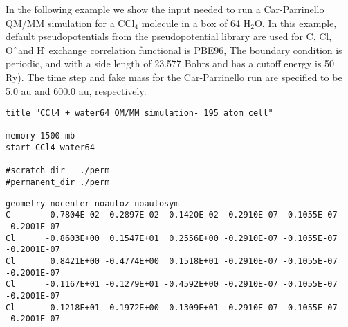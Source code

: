 In the following example we show the input needed to run a Car-Parrinello 
QM/MM simulation for a CCl$_4$ molecule in a box of 64 H$_2$O. 
In this example, default pseudopotentials from the pseudopotential library are used 
for C, Cl, O\^\ and H\^\, exchange correlation functional is PBE96, The boundary condition is periodic, and
with a side length of 23.577 Bohrs and has a cutoff energy is 50 Ry).  The time step and fake mass
for the Car-Parrinello run are specified to be 5.0 au and 600.0 au, respectively.
\normalsize
\begin{verbatim}
title "CCl4 + water64 QM/MM simulation- 195 atom cell"

memory 1500 mb
start CCl4-water64

#scratch_dir   ./perm
#permanent_dir ./perm
\end{verbatim}
\tiny
\begin{verbatim}
geometry nocenter noautoz noautosym
C        0.7804E-02 -0.2897E-02  0.1420E-02 -0.2910E-07 -0.1055E-07 -0.2001E-07
Cl      -0.8603E+00  0.1547E+01  0.2556E+00 -0.2910E-07 -0.1055E-07 -0.2001E-07
Cl       0.8421E+00 -0.4774E+00  0.1518E+01 -0.2910E-07 -0.1055E-07 -0.2001E-07
Cl      -0.1167E+01 -0.1279E+01 -0.4592E+00 -0.2910E-07 -0.1055E-07 -0.2001E-07
Cl       0.1218E+01  0.1972E+00 -0.1309E+01 -0.2910E-07 -0.1055E-07 -0.2001E-07


\end{verbatim}
